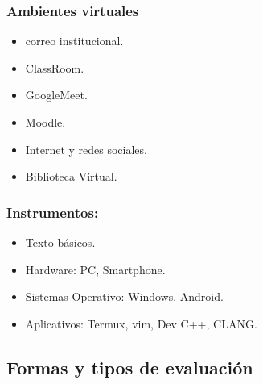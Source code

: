 \documentclass[a4paper,12pt,spanish]{article}
\newcommand{\cmark}{\ding{51}}%
\newcommand{\xmark}{\ding{55}}%
\newcommand{\done}{\rlap{$\square$}{\raisebox{2pt}{\large\hspace{1pt}\cmark}}%
\hspace{-2.5pt}}
\newcommand{\wontfix}{\rlap{$\square$}{\large\hspace{1pt}\xmark}}
\begin{document}
\subsubsection{Ambientes virtuales}
\label{sec:ambientes-virtuales}
\begin{itemize}
\item [\done] correo institucional.
\item [\wontfix] ClassRoom.
\item [\done] GoogleMeet.
\item [\done] Moodle.
\item [\done] Internet y redes sociales.
\item [\done] Biblioteca Virtual.
\end{itemize}

\subsubsection{Instrumentos:}
\label{sec:instrumentos}

\begin{itemize}
\item [\done] Texto básicos.
\item [\done] Hardware: PC, Smartphone.
\item [\done] Sistemas Operativo:  Windows, Android.
\item [\done] Aplicativos: Termux, vim, Dev C++, CLANG.
\end{itemize}



\subsection{Formas y tipos de evaluación}
\label{sec:formas-y-tipos}
\end{document}
